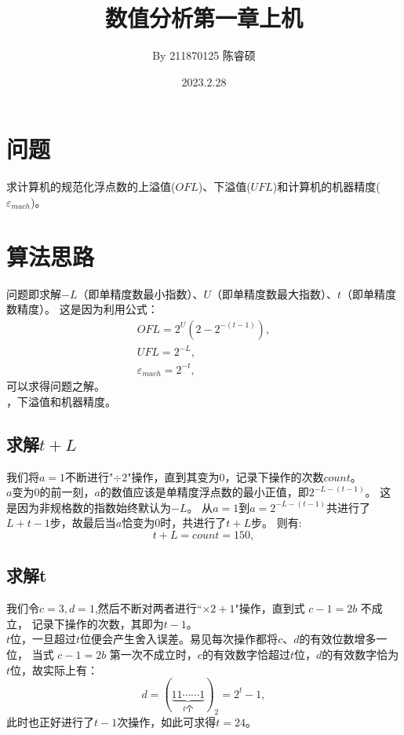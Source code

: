 \documentclass[a4paper,11pt,openany,notitlepage]{book}
\title{\vspace{-1.5cm} \textbf{\huge{数值分析第一章上机}}\vspace{-1em}}
\author{By 211870125 陈睿硕}
\date{\vspace{-0.5cm}2023.2.28}
\begin{document}
\maketitle
\vspace{-1cm}
\thispagestyle{fancy}

\section{问题}
求计算机的规范化浮点数的上溢值($OFL$)、下溢值($UFL$)和计算机的机器精度($\varepsilon_{mach}$)。

\section{算法思路}
问题即求解$-L$（即单精度数最小指数）、$U$（即单精度数最大指数）、$t$（即单精度数精度）。
这是因为利用公式：
\begin{gather}
    OFL = 2^{U} (2 - 2^{-(t-1)}), \label{Eq1.1}\\
    UFL = 2^{-L}, \label{Eq1.2}\\
    \varepsilon_{mach} = 2^{-t}, \label{Eq1.3}
\end{gather}
可以求得问题之解。\\
，下溢值和机器精度。
\subsection{求解$t + L$}
我们将$a = 1$不断进行"$\div 2$"操作，直到其变为0，记录下操作的次数$count$。\\
$a$变为0的前一刻，$a$的数值应该是单精度浮点数的最小正值，即$2^{-L-(t-1)}$。
这是因为非规格数的指数始终默认为$-L$。
从$a = 1$到$a = 2^{-L-(t-1)}$共进行了$L + t - 1$步，故最后当$a$恰变为$0$时，共进行了$t + L$步。
则有:
\begin{equation}
    t + L = count = 150, \label{Eq1.4}  
\end{equation}

\subsection{求解t}
我们令$c = 3,d = 1$,然后不断对两者进行“$\times 2 + 1$"操作，直到式 $c - 1 = 2b$ 不成立，
记录下操作的次数，其即为$t - 1$。\\
$t$位，一旦超过$t$位便会产生舍入误差。易见每次操作都将$c$、$d$的有效位数增多一位，
当式 $c - 1 = 2b$ 第一次不成立时，$c$的有效数字恰超过$t$位，$d$的有效数字恰为$t$位，故实际上有：
\begin{equation}
    d = (\underbrace{11\cdots\cdots1}_{t\text{个}})_{2} = 2^{t} - 1, \label{Eq1.5}
\end{equation}
此时也正好进行了$t - 1$次操作，如此可求得$t = 24$。
\end{document}
